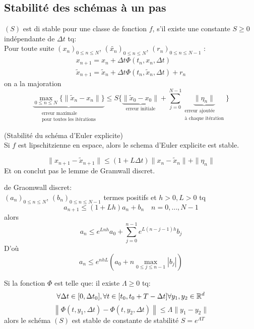 \subsection{Stabilité des schémas à un pas}
\begin{definition}
    $(S)$ est di stable pour une classe de fonction  $f$, s'il existe une constante  $S \ge 0$ indépendante de $\Delta t$ tq:\\
    Pour toute suite  $(x_n)_{0 \le n \le N}$, $(\tilde{x_n})_{0 \le n \le N}$, $(r_n)_{0 \le n \le N-1}$ :
    \begin{align*}
        x_{n+1} = x_n + \Delta t \Phi(t_n, x_n, \Delta t)\\
        \tilde{x}_{n+1} = \tilde{x}_n + \Delta t \Phi(t_n, \tilde{x}_{n}, \Delta t) + r_n
    \end{align*}
    on a la majoration 
    \[
        \underbrace{\max_{0 \le n \le N} \{ \|\tilde{x}_n - x_n\|  \}}_{\substack{\text{erreur maximale}\\ \text{pour toutes les itérations}}} \le S \{ \underbrace{\|\tilde{x}_0 - x_0\|}_{\text{erreur initiale}} + \sum_{j=0}^{N-1} \underbrace{\|\eta_n\|}_{\substack{\text{erreur ajoutée}\\ \text{à chaque itération}}} \}
    \] 
\end{definition}
\begin{prop}
    (Stabilité du schéma d'Euler explicite) \\ 
    Si $f$ est lipschitzienne en espace, alors le schema d'Euler explicite est stable.
\end{prop}
\begin{preuve}
    \[
        \|x_{n+1} - \tilde{x}_{n+1}\| \le (1 + L\Delta t) \|x_n - \tilde{x}_n\| + \|\eta_n\|
    \] 
    Et on conclut pas le lemme de Gramwall discret.
\end{preuve}
\begin{lemma}
   de Graomwall discret:\\  
   $(a_n)_{0 \le n \le N}$, $(b_n)_{0 \le n \le N-1}$ termes positifs et $h > 0, L > 0$ tq
    \[
   a_{n+1} \le (1 + Lh)a_n + b_n \quad n = 0, \ldots, N-1
   \] 
   alors
   \[
       a_n \le e^{Lnh} a_0 + \sum_{j=0}^{n-1} e^{L(n - j - 1)h}b_j
   \] 
   D'où
   \[
       a_n \le e^{nhL}(a_0 + n\max_{0 \le j \le n-1}|b_j|)
   \] 
\end{lemma}
\begin{prop}
   Si la fonction $\Phi$  est telle que: il existe $\Lambda \ge 0$ tq:
   \[
       \forall \Delta t \in [0, \Delta t_0], \forall t \in [t_0, t_0 + T - \Delta t] \forall y_1, y_2 \in \mathbb{R}^d
   \] 
   \[
   \left\| \Phi(t, y_1, \Delta t) - \Phi(t, y_2, \Delta t) \right\| \le \Lambda \|y_1 - y_2\|
   \] 
   alors le schéma $(S)$ est stable de constante de stabilité  $S = e^{\Lambda T}$
\end{prop}

